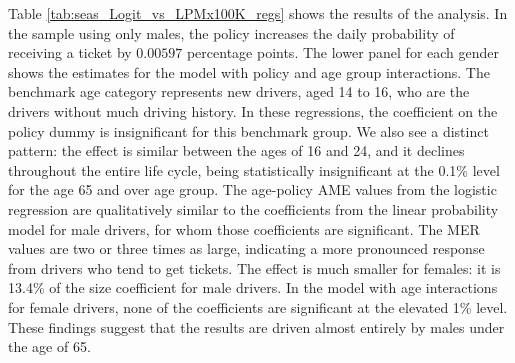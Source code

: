 Table \ref{tab:seas_Logit_vs_LPMx100K_regs} shows the results of the analysis.
In the sample using only males, 
the policy increases the daily probability of receiving a ticket by $0.00597$ 
percentage points. 
The lower panel for each gender shows the estimates for the model with 
policy and age group interactions.  
The benchmark age category represents new drivers, 
aged 14 to 16, who are the drivers without much driving history.
In these regressions,   
the coefficient on the policy dummy is insignificant for this benchmark group. 
We also see a distinct pattern: 
the effect is similar between the ages of 16 and 24, 
and it declines throughout the entire life cycle, being statistically insignificant at the 0.1\% level for the age 65 and over age group.
% 
The age-policy AME values from the logistic regression 
are qualitatively similar to the coefficients from the linear probability model for male drivers, 
for whom those coefficients are significant. 
The MER values are two or three times as large, 
indicating a more pronounced response from drivers who tend to get tickets. 
% 
The effect is much smaller for females: it is 13.4\% of the size coefficient for male drivers. 
In the model with age interactions for female drivers, 
none of the coefficients are significant at the elevated 1\% level. 
These findings suggest that the results are driven almost entirely by males under the age of 65.
%

% 
%

